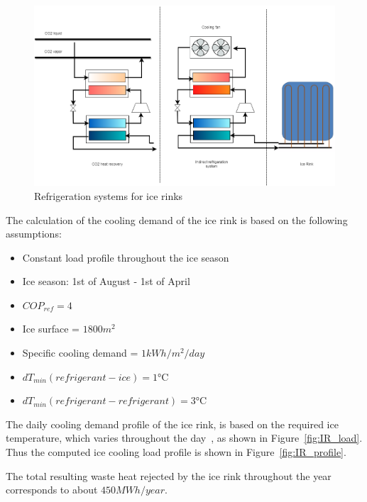 \documentclass{article}
\begin{document}
\begin{figure}[htp]
	\centering
	\includegraphics[width=1\textwidth]{IceRink_refrigeration.png}
	\caption{Refrigeration systems for ice rinks}
	\label{fig:IR_refSystem}
\end{figure}

The calculation of the cooling demand of the ice rink is based on the following assumptions:
\begin{itemize}
	\item Constant load profile throughout the ice season
	\item Ice season: 1st of August - 1st of April
	\item $COP_{ref} = 4$~\cite{kolasniewskiEvaluationModellingIce2017}
	\item Ice surface = $1800m^2 $~\cite{kolasniewskiEvaluationModellingIce2017}
	\item Specific cooling demand = $1kWh/m^2/day$~\cite{kolasniewskiEvaluationModellingIce2017}
	\item $dT_{min}(refrigerant-ice) = 1 \si{\celsius}$
	\item $dT_{min}(refrigerant-refrigerant) = 3 \si{\celsius}$
\end{itemize}

The daily cooling demand profile of the ice rink, is based on the required ice temperature, which varies throughout the day~\cite{kolasniewskiEvaluationModellingIce2017}, as shown in Figure~\ref{fig:IR_load}. Thus the computed ice cooling load profile is shown in Figure~\ref{fig:IR_profile}.

The total resulting waste heat rejected by the ice rink throughout the year corresponds to about $ 450 MWh/year$.
\end{document}
